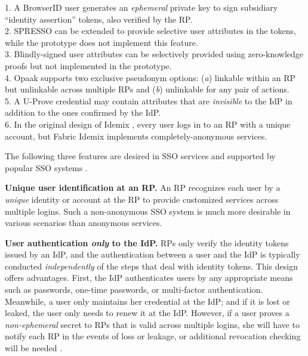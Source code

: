 \begin{table}[tb]
\begin{tabular}{|c|c|c|c|c|c|c|}
\end{tabular}
    \label{tbl:comparison-protocol}
\flushleft
{\footnotesize
1. A BrowserID user generates an \emph{ephemeral} private key to sign subsidiary ``identity assertion'' tokens,
also verified by the RP.\\
2. SPRESSO can be extended to provide selective user attributes in the tokens, while the prototype does not implement this feature.\\
3. Blindly-signed user attributes can be selectively provided using zero-knowledge proofs but not implemented in the prototype.\\
4. Opaak supports two exclusive pseudonym options: (\emph{a}) linkable within an RP but unlinkable across multiple RPs and (\emph{b}) unlinkable for any pair of actions.\\
5. A U-Prove credential may contain attributes that are \emph{invisible} to the IdP in addition to the ones confirmed by the IdP. \\
6. In the original design of Idemix \cite{idemix}, every user logs in to an RP with a unique account, but Fabric Idemix implements completely-anonymous services.
}
\end{table}

The following three features are desired in SSO services and supported by popular SSO systems \cite{NIST2017draft, OpenIDConnect,rfc6749, SAML, SAMLIdentifier}.

\noindent \textbf{Unique user identification at an RP.}
An RP recognizes each user by a \emph{unique} identity or account at the RP to provide customized services across multiple logins.
Such a non-anonymous SSO system is much more desirable in various scenarios than anonymous services.

\noindent\textbf{User authentication {\em only} to the IdP.}
RPs only verify the identity tokens issued by an IdP, and the authentication between a user and the IdP is typically conducted \emph{independently} of the steps that deal with identity tokens.
This design offers advantages. First, the IdP authenticates users by any appropriate means such as passwords, one-time passwords, or multi-factor authentication.
Meanwhile, a user only maintains her credential at the IdP; and if it is lost or leaked, the user only needs to renew it at the IdP.
However, if a user proves a \emph{non-ephemeral} secret to RPs that is valid across multiple logins, she will have to notify each RP in the events of loss or leakage, or additional revocation checking will be needed \cite{ELPASSO, UnlimitID}.

